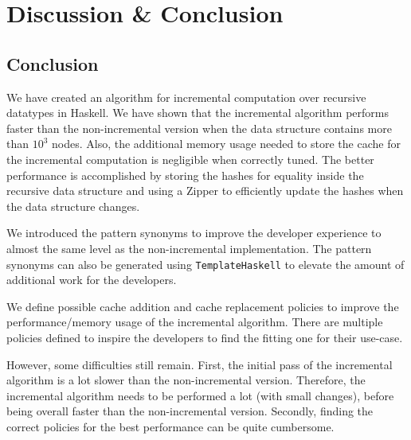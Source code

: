 \chapter{Discussion \& Conclusion}





\section{Conclusion}

We have created an algorithm for incremental computation over recursive datatypes in Haskell. We have shown that the incremental algorithm performs faster than the non-incremental version when the data structure contains more than $10^3$ nodes. Also, the additional memory usage needed to store the cache for the incremental computation is negligible when correctly tuned. The better performance is accomplished by storing the hashes for equality inside the recursive data structure and using a Zipper to efficiently update the hashes when the data structure changes.

We introduced the pattern synonyms to improve the developer experience to almost the same level as the non-incremental implementation. The pattern synonyms can also be generated using \texttt{TemplateHaskell} to elevate the amount of additional work for the developers.

We define possible cache addition and cache replacement policies to improve the performance/memory usage of the incremental algorithm. There are multiple policies defined to inspire the developers to find the fitting one for their use-case.

However, some difficulties still remain. First, the initial pass of the incremental algorithm is a lot slower than the non-incremental version. Therefore, the incremental algorithm needs to be performed a lot (with small changes), before being overall faster than the non-incremental version. Secondly, finding the correct policies for the best performance can be quite cumbersome. 
